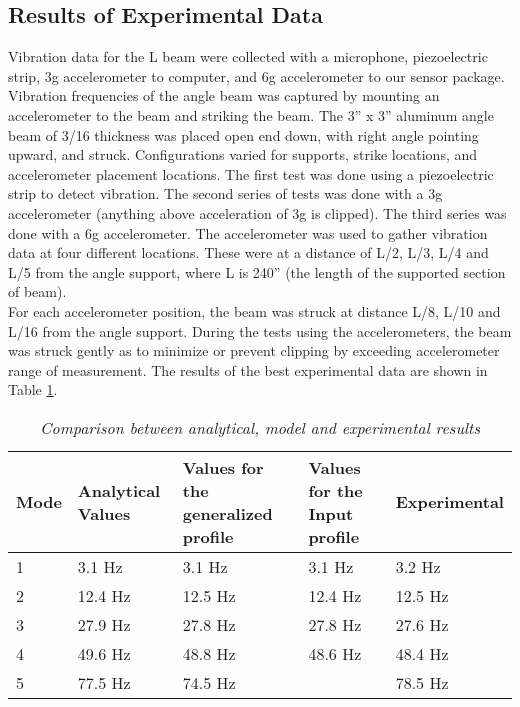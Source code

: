 \subsection{Results of Experimental Data}
\indent Vibration data for the L beam were collected with a microphone, piezoelectric strip, 3g accelerometer to computer, and 6g accelerometer to our sensor package. Vibration frequencies of the angle beam was captured by mounting an accelerometer to the beam and striking the beam. The 3” x 3” aluminum angle beam of 3/16 thickness was placed open end down, with right angle pointing upward, and struck. Configurations varied for supports, strike locations, and accelerometer placement locations. The first test was done using a piezoelectric strip to detect vibration. The second series of tests was done with a 3g accelerometer (anything above acceleration of 3g is clipped). The third series was done with a 6g accelerometer.
\indent The accelerometer was used to gather vibration data at four different locations. These were at a distance of L/2, L/3, L/4 and L/5 from the angle support, where L is 240” (the length of the supported section of beam).\\
\indent For each accelerometer position, the beam was struck at distance L/8, L/10 and L/16 from the angle support. During the tests using the accelerometers, the beam was struck gently as to minimize or prevent clipping by exceeding accelerometer range of measurement. The results of the best experimental data are shown in Table \ref{tab:Results_Comp}.\\
\begin{table}
\begin{center}
    \begin{tabular}{|l| p{3.5cm}| p{3cm}| p{3cm}| p{3cm}|}
    \hline
    \textbf{Mode} & \textbf{Analytical Values} & \textbf{Values for the generalized profile} & \textbf{Values for the Input profile} & \textbf{Experimental} \\\hline
    1    & 3.1 Hz            & 3.1 Hz                             & 3.1 Hz                       & 3.2 Hz       \\\hline
    2    & 12.4 Hz           & 12.5 Hz                            & 12.4 Hz                      & 12.5 Hz      \\\hline
    3    & 27.9 Hz           & 27.8 Hz                            & 27.8 Hz                      & 27.6 Hz      \\\hline
    4    & 49.6 Hz           & 48.8 Hz                            & 48.6 Hz                      & 48.4 Hz      \\\hline
    5    & 77.5 Hz           & 74.5 Hz                            &                             & 78.5 Hz      \\\hline
    \end{tabular}
    \caption{\textit{Comparison between analytical, model and experimental results}}
    \label{tab:Results_Comp}
\end{center}
\end{table}

